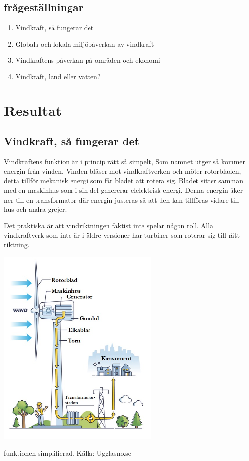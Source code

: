 \documentclass[11p]{article}
\begin{document}
    \subsection{frågeställningar}
    \begin{enumerate}
        \item Vindkraft, så fungerar det
        \item Globala och lokala miljöpåverkan av vindkraft
        \item Vindkraftens påverkan på områden och ekonomi
        \item Vindkraft, land eller vatten?
    \end{enumerate}

    \section{Resultat}

    \subsection{Vindkraft, så fungerar det}

  Vindkraftens funktion är i princip rätt så simpelt, Som namnet utger så kommer energin från vinden.
  Vinden blåser mot vindkraftverken och möter rotorbladen, detta tillför mekanisk energi som får
  bladet att rotera sig.
  Bladet sitter samman med en maskinhus som i sin del genererar elelektrisk
  energi.
  Denna energin åker ner till en transformator där energin justeras så att den kan tillföras
  vidare till hus och andra grejer.

  Det praktiska är att vindriktningen faktist inte spelar någon  roll.
   Alla vindkraftverk som inte är i äldre versioner har turbiner som roterar sig till rätt riktning.

    \includegraphics[width=0.6\textwidth]{../images/vindhur.jpg}
    \caption{funktionen simplifierad. Källa: Ugglasno.se}
\end{document}

